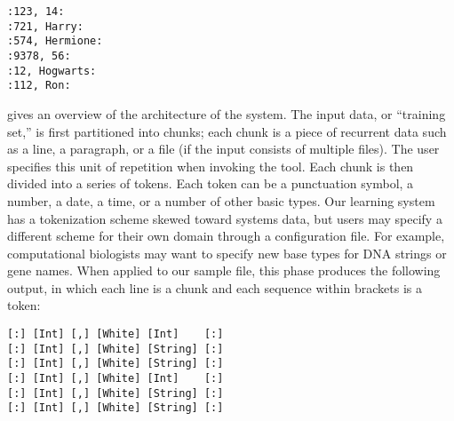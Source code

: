 \documentclass[preprint]{sig-alternate-sigmod08}
\begin{document}
{\small 
\begin{verbatim}
:123, 14:
:721, Harry:
:574, Hermione:
:9378, 56:
:12, Hogwarts:
:112, Ron:
\end{verbatim}
}

 gives an overview of the architecture of the system.
The input data, or ``training set,'' is first partitioned into chunks;
each chunk is a piece of recurrent data such as a line, 
a paragraph, or a file (if the input consists of multiple files).
The user specifies this unit of repetition when invoking the tool.
Each chunk is then divided into a series of tokens.  Each
token can be a punctuation symbol, a number, a date, a time, or a number of other
basic types.  Our learning system has a tokenization scheme
skewed toward systems data, but users may specify a different scheme 
for their own domain through a configuration file.  For example,
computational biologists may want to specify new base types for DNA strings
or gene names.  When applied to our sample file,
this phase produces the following output, in which each line is a chunk
and each sequence within brackets is a token:

{\small
\begin{verbatim}
[:] [Int] [,] [White] [Int]    [:]
[:] [Int] [,] [White] [String] [:]
[:] [Int] [,] [White] [String] [:]
[:] [Int] [,] [White] [Int]    [:]
[:] [Int] [,] [White] [String] [:]
[:] [Int] [,] [White] [String] [:]
\end{verbatim}
}

\begin {figure*}[tbh]
\begin{center}
\begin{minipage}[t]{0.5\columnwidth}
\end{minipage}
\hfill
\begin{minipage}[t]{0.5\columnwidth}
\end{minipage}
\hfill
\begin{minipage}[t]{0.5\columnwidth}
\end{minipage}
\caption{Histograms calculuated from sample data file (from left to right): 
(a) first iteration, (b) second iteration (context 1) 
and (c) second iteration (context 2)} \label{fig-hist}
\vspace*{-5mm}
\end{center}
\end{figure*}
\end{document}
